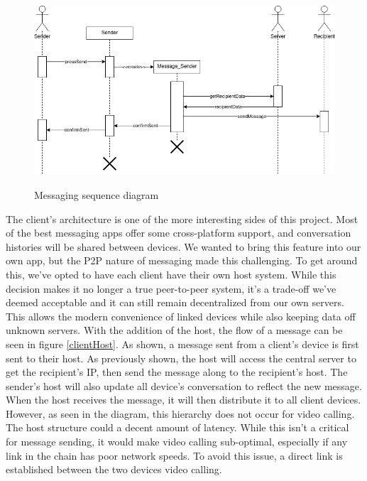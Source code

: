 \documentclass[titlepage]{article}
\begin{document}
      \begin{center}
          \begin{figure}[!ht]
              \includegraphics[scale=.5]{graphics/SequenceDiagram.png}
              \label{sequence}
              \caption{Messaging sequence diagram}
          \end{figure}
      \end{center}

      The client's architecture is one of the more interesting sides of this project.
      Most of the best messaging apps offer some cross-platform support, and conversation histories will be shared between devices.
      We wanted to bring this feature into our own app, but the P2P nature of messaging made this challenging.
      To get around this, we've opted to have each client have their own host system.
      While this decision makes it no longer a true peer-to-peer system, it's a trade-off we've deemed acceptable and it can still remain decentralized from our own servers.
      This allows the modern convenience of linked devices while also keeping data off unknown servers.
      With the addition of the host, the flow of a message can be seen in figure \ref{clientHost}.
      As shown, a message sent from a client's device is first sent to their host.
      As previously shown, the host will access the central server to get the recipient's IP, then send the message along to the recipient's host.
      The sender's host will also update all device's conversation to reflect the new message.
      When the host receives the message, it will then distribute it to all client devices.
      However, as seen in the diagram, this hierarchy does not occur for video calling.
      The host structure could a decent amount of latency.
      While this isn't a critical for message sending, it would make video calling sub-optimal, especially if any link in the chain has poor network speeds.
      To avoid this issue, a direct link is established between the two devices video calling.
\end{document}
